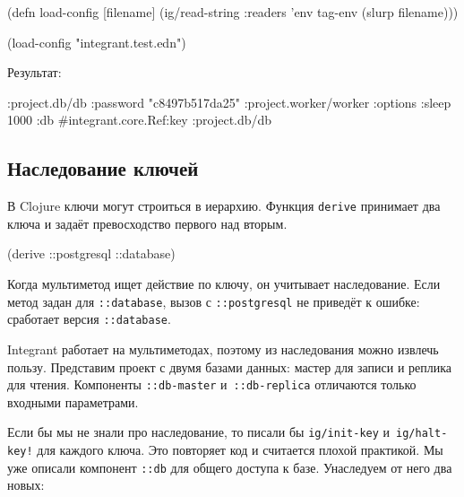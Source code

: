 \begin{english}
  \begin{clojure}
(defn load-config [filename]
  (ig/read-string {:readers {'env tag-env}}
                  (slurp filename)))

(load-config "integrant.test.edn")
  \end{clojure}
\end{english}

\noindent
Результат:

\begin{english}
  \begin{clojure}
{:project.db/db {:password "c8497b517da25"}
 :project.worker/worker
 {:options {:sleep 1000}
  :db #integrant.core.Ref{:key :project.db/db}}}
  \end{clojure}
\end{english}

\subsection{Наследование ключей}


В Clojure ключи могут строиться в иерархию. Функция \verb|derive| принимает
два ключа и задаёт превосходство первого над вторым.


\begin{english}
  \begin{clojure}
(derive ::postgresql ::database)
  \end{clojure}
\end{english}

Когда мультиметод ищет действие по ключу, он учитывает наследование. Если метод
задан для \verb|::database|, вызов с \verb|::postgresql| не приведёт к ошибке:
сработает версия \verb|::database|.

Integrant работает на мультиметодах, поэтому из наследования можно извлечь
пользу. Представим проект с двумя базами данных: мастер для записи и реплика для
чтения. Компоненты \verb|::db-master| и~\verb|::db-replica| отличаются только
входными параметрами.

Если бы мы не знали про наследование, то писали бы \verb|ig/init-key|
и~\verb|ig/halt-key!| для каждого ключа. Это повторяет код и считается плохой
практикой. Мы уже описали компонент \verb|::db| для общего доступа к
базе. Унаследуем от него два новых:

